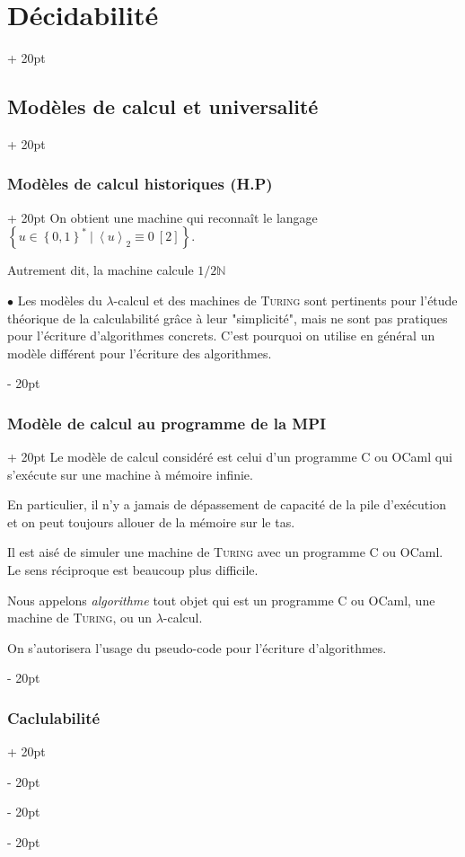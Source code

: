 \documentclass[a4paper, 12pt, twoside]{article}
\newcommand{\N}{\mathbb{N}} %
\newcommand{\set}[1]{\left\{ #1 \right\}}
\newcommand{\lrangle}[1]{\left\langle #1 \right\rangle}
\newcommand{\ind}[1][20pt]{\advance\leftskip + #1}
\newcommand{\deind}[1][20pt]{\advance\leftskip - #1}
\newenvironment{indt}[2][20pt]{#2 \par \ind[#1]}{\par \deind} %
\begin{document}
\begin{indt}{\section{Décidabilité}}
\begin{indt}{\subsection{Modèles de calcul et universalité}}
\begin{indt}{\subsubsection{Modèles de calcul historiques (H.P)}}
                 On obtient une machine qui reconnaît le langage $\set{u \in \set{0, 1}^*\ |\ \lrangle u _2 \equiv 0\ [2]}$.

                 Autrement dit, la machine calcule $1/2\N$

                 \vspace{12pt}
                 
                 $\bullet$ Les modèles du $\lambda$-calcul et des machines de \textsc{Turing} sont pertinents pour l'étude théorique de la calculabilité grâce à leur "simplicité", mais ne sont pas pratiques pour l'écriture d'algorithmes concrets. C'est pourquoi on utilise en général un modèle différent pour l'écriture des algorithmes.
            \end{indt}

            \vspace{12pt}
            
            \begin{indt}{\subsubsection{Modèle de calcul au programme de la MPI}}
                Le modèle de calcul considéré est celui d'un programme C ou OCaml qui s'exécute sur une machine à mémoire infinie.

                En particulier, il n'y a jamais de dépassement de capacité de la pile d'exécution et on peut toujours allouer de la mémoire sur le tas.

                Il est aisé de simuler une machine de \textsc{Turing} avec un programme C ou OCaml.
                Le sens réciproque est beaucoup plus difficile.

                Nous appelons \emph{algorithme} tout objet qui est un programme C ou OCaml, une machine de \textsc{Turing}, ou un $\lambda$-calcul.

                On s'autorisera l'usage du pseudo-code pour l'écriture d'algorithmes.
            \end{indt}

            \vspace{12pt}
            
            \begin{indt}{\subsubsection{Caclulabilité}}
                \label{1.1.4}


\end{indt}
\end{indt}
\end{indt}
\end{document}
